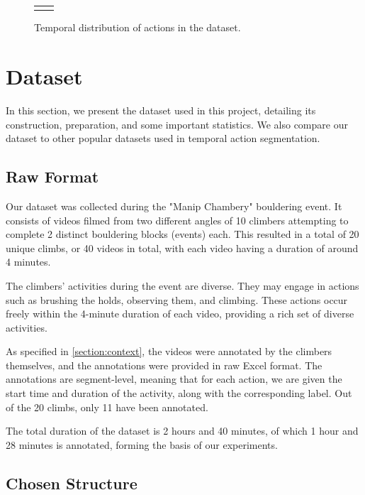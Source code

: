 \begin{figure}[t]
\begin{tabular}{@{}cc@{}}
    \begin{minipage}{0.45\textwidth}\centering\caption{Distribution of actions in the dataset.}\label{figure:distribution-of-actions-in-dataset}\end{minipage} &
    \begin{minipage}{0.45\textwidth}\centering\caption{Temporal distribution of actions in the dataset.}\label{figure:temporal-distribution-of-actions}\end{minipage}
  \end{tabular}
\end{figure}
\section{Dataset}

In this section, we present the dataset used in this project, detailing its construction, preparation, and some important statistics. We also compare our dataset to other popular datasets used in temporal action segmentation.

\subsection{Raw Format}

Our dataset was collected during the "Manip Chambery" bouldering event. It consists of videos filmed from two different angles of 10 climbers attempting to complete 2 distinct bouldering blocks (events) each. This resulted in a total of 20 unique climbs, or 40 videos in total, with each video having a duration of around 4 minutes.

The climbers' activities during the event are diverse. They may engage in actions such as brushing the holds, observing them, and climbing. These actions occur freely within the 4-minute duration of each video, providing a rich set of diverse activities.

As specified in \ref{section:context}, the videos were annotated by the climbers themselves, and the annotations were provided in raw Excel format. The annotations are segment-level, meaning that for each action, we are given the start time and duration of the activity, along with the corresponding label. Out of the 20 climbs, only 11 have been annotated.

The total duration of the dataset is 2 hours and 40 minutes, of which 1 hour and 28 minutes is annotated, forming the basis of our experiments.

\subsection{Chosen Structure}

